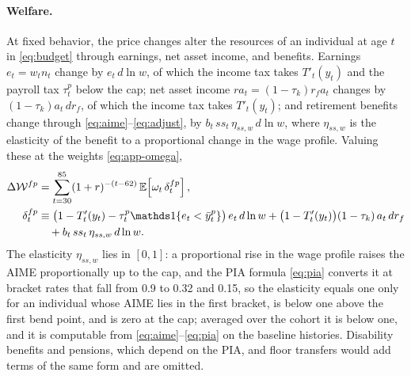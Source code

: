 \paragraph{Welfare.}
At fixed behavior, the price changes alter the resources of an individual at age $t$ in \eqref{eq:budget} through earnings, net asset income, and benefits. Earnings $e_t=w_tn_t$ change by $e_t\,d\ln w$, of which the income tax takes $T'_t(y_t)$ and the payroll tax $\tau^{p}_t$ below the cap; net asset income $ra_t=(1-\tau_k)r_fa_t$ changes by $(1-\tau_k)a_t\,dr_f$, of which the income tax takes $T'_t(y_t)$; and retirement benefits change through \eqref{eq:aime}--\eqref{eq:adjust}, by $b_t\,ss_t\,\eta_{ss,w}\,d\ln w$, where $\eta_{ss,w}$ is the elasticity of the benefit to a proportional change in the wage profile. Valuing these at the weights \eqref{eq:app-omega},
\begin{equation}\label{eq:ge-welfare}
\begin{aligned}
\Delta\mathcal{W}^{fp}&=\sum_{t=30}^{85}(1+r)^{-(t-62)}\,\E\!\left[\omega_t\,\delta^{fp}_t\right],\\
\delta^{fp}_t&\equiv\bigl(1-T'_t(y_t)-\tau^{p}_t\ind{e_t<\bar y^{p}_t}\bigr)\,e_t\,d\ln w+\bigl(1-T'_t(y_t)\bigr)(1-\tau_k)\,a_t\,dr_f\\
&\quad+b_t\,ss_t\,\eta_{ss,w}\,d\ln w .
\end{aligned}
\end{equation}
The elasticity $\eta_{ss,w}$ lies in $[0,1]$: a proportional rise in the wage profile raises the AIME proportionally up to the cap, and the PIA formula \eqref{eq:pia} converts it at bracket rates that fall from 0.9 to 0.32 and 0.15, so the elasticity equals one only for an individual whose AIME lies in the first bracket, is below one above the first bend point, and is zero at the cap; averaged over the cohort it is below one, and it is computable from \eqref{eq:aime}--\eqref{eq:pia} on the baseline histories. Disability benefits and pensions, which depend on the PIA, and floor transfers would add terms of the same form and are omitted.

